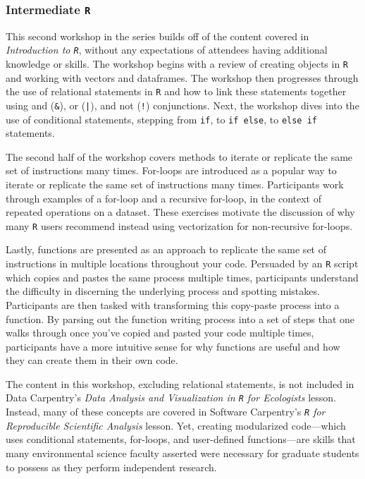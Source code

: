 \documentclass[12pt]{article}
\begin{document}
\subsubsection{Intermediate \texttt{R}}
\label{sec:intermed}

\quad This second workshop in the series builds off of the content covered in \emph{Introduction to \texttt{R}}, without any expectations of attendees having additional knowledge or skills. The workshop begins with a review of creating objects in \texttt{R} and working with vectors and dataframes. The workshop then progresses through the use of relational statements in \texttt{R} and how to link these statements together using and (\texttt{\&}), or (\texttt{|}), and not (\texttt{!}) conjunctions. Next, the workshop dives into the use of conditional statements, stepping from \texttt{if}, to \texttt{if else}, to \texttt{else if} statements. 

\quad The second half of the workshop covers methods to iterate or replicate the same set of instructions many times. For-loops are introduced as a popular way to iterate or replicate the same set of instructions many times. Participants work through examples of a for-loop and a recursive for-loop, in the context of repeated operations on a dataset. These exercises motivate the discussion of why many \texttt{R} users recommend instead using vectorization for non-recursive for-loops. 

\quad Lastly, functions are presented as an approach to replicate the same set of instructions in multiple locations throughout your code. Persuaded by an \texttt{R} script which copies and pastes the same process multiple times, participants understand the difficulty in discerning the underlying process and spotting mistakes. Participants are then tasked with transforming this copy-paste process into a function. By parsing out the function writing process into a set of steps that one walks through once you've copied and pasted your code multiple times, participants have a more intuitive sense for why functions are useful and how they can create them in their own code.

\quad The content in this workshop, excluding relational statements, is not included in Data Carpentry's \emph{Data Analysis and Visualization in \texttt{R} for Ecologists} lesson. Instead, many of these concepts are covered in Software Carpentry's \emph{\texttt{R} for Reproducible Scientific Analysis} lesson. Yet, creating modularized code---which uses conditional statements, for-loops, and user-defined functions---are skills that many environmental science faculty asserted were necessary for graduate students to possess as they perform independent research.  
\end{document}
